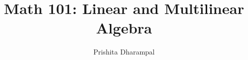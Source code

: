 \title{Math 101: Linear and Multilinear Algebra}

\author{Prishita Dharampal}
\date{}
\maketitle
\vspace{-0.3in}
